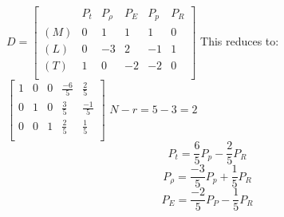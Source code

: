 \documentclass[12pt]{article}
\begin{document}
	$
	D = 
	\begin{bmatrix}
		& P_t & P_{\rho} & P_E & P_p & P_R \\
		(M) & 0 & 1 & 1 & 1 & 0 \\
		(L) & 0 & -3 & 2 & -1 & 1 \\
		(T) & 1 & 0 & -2 & -2 & 0 \\
	\end{bmatrix}
	$
	This reduces to:\\
	$
	\begin{bmatrix}
		1 & 0 & 0 & \frac{-6}{5} & \frac{2}{5} \\
		0 & 1 & 0 & \frac{3}{5} & \frac{-1}{5} \\
		0 & 0 & 1 & \frac{2}{5} & \frac{1}{5} \\
	\end{bmatrix}
	$
	$N - r = 5 - 3 = 2$\\
	$$P_t = \frac{6}{5}P_p - \frac{2}{5}P_R$$
	$$P_{\rho} = \frac{-3}{5}P_p + \frac{1}{5}P_R$$
	$$P_{E} = \frac{-2}{5}P_P - \frac{1}{5}P_R$$
\end{document}
